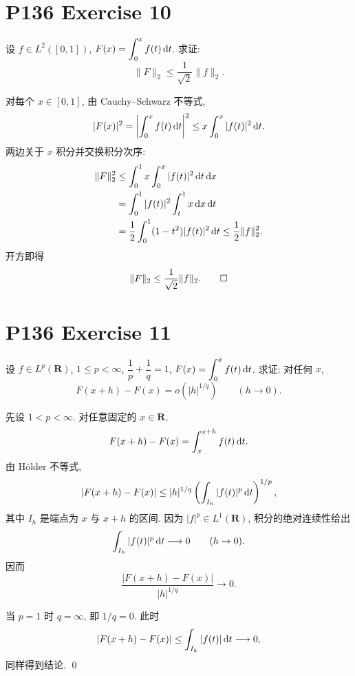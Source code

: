 \documentclass{article}
\begin{document}
\section{P136 Exercise 10}

设 $f\in L^2([0,1])$, $F(x)=\displaystyle\int_0^x f(t)\,\mathrm{d} t$.
求证:
\[
  \|F\|_2\le \frac1{\sqrt2}\|f\|_2.
\]

\begin{solution}
  对每个 $x\in[0,1]$, 由 Cauchy--Schwarz 不等式,
  \[
    |F(x)|^2
    =\left|\int_0^x f(t)\,\mathrm{d} t\right|^2
    \le x\int_0^x|f(t)|^2\,\mathrm{d} t.
  \]
  两边关于 $x$ 积分并交换积分次序:
  \begin{align*}
    \|F\|_2^2
    &\le \int_0^1x\int_0^x|f(t)|^2\,\mathrm{d} t\,\mathrm{d} x  \\
    &=\int_0^1|f(t)|^2\int_t^1x\,\mathrm{d} x\,\mathrm{d} t  \\
    &=\frac12\int_0^1(1-t^2)|f(t)|^2\,\mathrm{d} t
    \le\frac12\|f\|_2^2.
  \end{align*}
  开方即得
  \[
    \|F\|_2\le\frac1{\sqrt2}\|f\|_2. \qed
  \]
\end{solution}

\section{P136 Exercise 11}

设 $f\in L^p(\mathbf R)$, $1\le p<\infty$,
$\dfrac1p+\dfrac1q=1$, $F(x)=\displaystyle\int_0^x f(t)\,\mathrm{d} t$.
求证: 对任何 $x$,
\[
  F(x+h)-F(x)=o(|h|^{1/q})\qquad (h\to0).
\]

\begin{solution}
  先设 $1<p<\infty$. 对任意固定的 $x\in\mathbf R$,
  \[
    F(x+h)-F(x)=\int_x^{x+h}f(t)\,\mathrm{d} t.
  \]
  由 Hölder 不等式,
  \[
    |F(x+h)-F(x)|
    \le |h|^{1/q}
      \left(\int_{I_h}|f(t)|^p\,\mathrm{d} t\right)^{1/p},
  \]
  其中 $I_h$ 是端点为 $x$ 与 $x+h$ 的区间. 因为
  $|f|^p\in L^1(\mathbf R)$, 积分的绝对连续性给出
  \[
    \int_{I_h}|f(t)|^p\,\mathrm{d} t\longrightarrow0
    \qquad(h\to0).
  \]
  因而
  \[
    \frac{|F(x+h)-F(x)|}{|h|^{1/q}}\longrightarrow0.
  \]

  当 $p=1$ 时 $q=\infty$, 即 $1/q=0$. 此时
  \[
    |F(x+h)-F(x)|\le\int_{I_h}|f(t)|\,\mathrm{d} t\longrightarrow0,
  \]
  同样得到结论. \qed
\end{solution}
\end{document}
